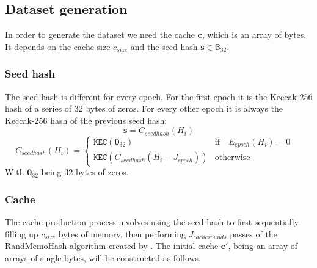 \documentclass[9pt,oneside]{amsart}
\begin{document}
\subsection{Dataset generation}
In order to generate the dataset we need the cache $\mathbf{c}$, which is an array of bytes. It depends on the cache size  $c_{size}$ and the seed hash $\mathbf{s} \in \mathbb{B}_{32}$.
\subsubsection{Seed hash}
The seed hash is different for every epoch. For the first epoch it is the Keccak-256 hash of a series of 32 bytes of zeros. For every other epoch it is always the Keccak-256 hash of the previous seed hash:
\begin{equation}
 \mathbf{s} = C_{seedhash}(H_i)
\end{equation}
\begin{equation}
 C_{seedhash}(H_i) = \begin{cases}
\texttt{KEC}(\mathbf{0}_{32}) & \text{if} \quad E_{epoch}(H_i) = 0 \quad  \\
\texttt{KEC}(C_{seedhash}(H_i - J_{epoch})) & \text{otherwise}
\end{cases}
\end{equation}
With $\mathbf{0}_{32}$ being 32 bytes of zeros.

\subsubsection{Cache}
The cache production process involves using the seed hash to first sequentially filling up $c_{size}$ bytes of memory, then performing $J_{cacherounds}$ passes of the RandMemoHash algorithm created by \cite{lerner2014randmemohash}. The initial cache $\mathbf{c'}$, being an array of arrays of single bytes, will be constructed as follows.
\end{document}
